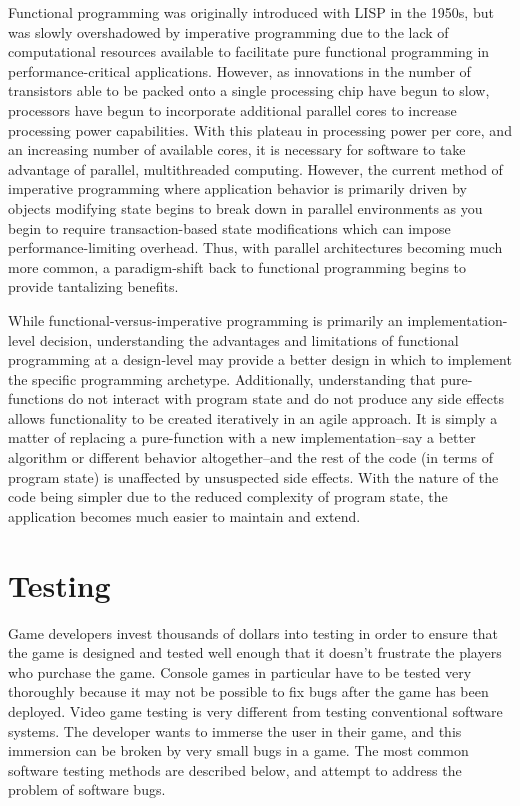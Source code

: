 Functional programming was originally introduced with LISP in the 1950s, but was slowly overshadowed by imperative programming due to the lack of computational resources available to facilitate pure functional programming in performance-critical applications. However, as innovations in the number of transistors able to be packed onto a single processing chip have begun to slow, processors have begun to incorporate additional parallel cores to increase processing power capabilities. With this plateau in processing power per core, and an increasing number of available cores, it is necessary for software to take advantage of parallel, multithreaded computing. However, the current method of imperative programming where application behavior is primarily driven by objects modifying state begins to break down in parallel environments as you begin to require transaction-based state modifications which can impose performance-limiting overhead. Thus, with parallel architectures becoming much more common, a paradigm-shift back to functional programming begins to provide tantalizing benefits.

While functional-versus-imperative programming is primarily an implementation-level decision, understanding the advantages and limitations of functional programming at a design-level may provide a better design in which to implement the specific programming archetype. Additionally, understanding that pure-functions do not interact with program state and do not produce any side effects allows functionality to be created iteratively in an agile approach. It is simply a matter of replacing a pure-function with a new implementation--say a better algorithm or different behavior altogether--and the rest of the code (in terms of program state) is unaffected by unsuspected side effects. With the nature of the code being simpler due to the reduced complexity of program state, the application becomes much easier to maintain and extend.

\section{Testing}

Game developers invest thousands of dollars into testing in order to ensure that the game is designed and tested well enough that it doesn't frustrate the players who purchase the game. Console games in particular have to be tested very thoroughly because it may not be possible to fix bugs after the game has been deployed. Video game testing is very different from testing conventional software systems. The developer wants to immerse the user in their game, and this immersion can be broken by very small bugs in a game. The most common software testing methods are described below, and attempt to address the problem of software bugs.

